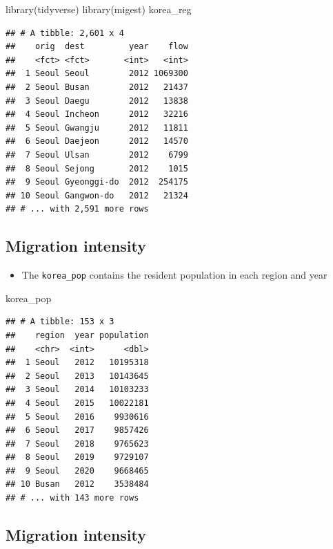 \documentclass[
]{book}
\newenvironment{Shaded}{\begin{snugshade}}{\end{snugshade}}
\newcommand{\FunctionTok}[1]{\textcolor[rgb]{0.00,0.00,0.00}{#1}}
\newcommand{\NormalTok}[1]{#1}
\providecommand{\tightlist}{%
  \setlength{\itemsep}{0pt}\setlength{\parskip}{0pt}}
\begin{document}
\begin{Shaded}
\begin{Highlighting}[]
\FunctionTok{library}\NormalTok{(tidyverse)}
\FunctionTok{library}\NormalTok{(migest)}
\NormalTok{korea\_reg}
\end{Highlighting}
\end{Shaded}

\begin{verbatim}
## # A tibble: 2,601 x 4
##    orig  dest         year    flow
##    <fct> <fct>       <int>   <int>
##  1 Seoul Seoul        2012 1069300
##  2 Seoul Busan        2012   21437
##  3 Seoul Daegu        2012   13838
##  4 Seoul Incheon      2012   32216
##  5 Seoul Gwangju      2012   11811
##  6 Seoul Daejeon      2012   14570
##  7 Seoul Ulsan        2012    6799
##  8 Seoul Sejong       2012    1015
##  9 Seoul Gyeonggi-do  2012  254175
## 10 Seoul Gangwon-do   2012   21324
## # ... with 2,591 more rows
\end{verbatim}

\hypertarget{migration-intensity-3}{%
\subsection{Migration intensity}\label{migration-intensity-3}}

\begin{itemize}
\tightlist
\item
  The \texttt{korea\_pop} contains the resident population in each region and year
\end{itemize}

\begin{Shaded}
\begin{Highlighting}[]
\NormalTok{korea\_pop}
\end{Highlighting}
\end{Shaded}

\begin{verbatim}
## # A tibble: 153 x 3
##    region  year population
##    <chr>  <int>      <dbl>
##  1 Seoul   2012   10195318
##  2 Seoul   2013   10143645
##  3 Seoul   2014   10103233
##  4 Seoul   2015   10022181
##  5 Seoul   2016    9930616
##  6 Seoul   2017    9857426
##  7 Seoul   2018    9765623
##  8 Seoul   2019    9729107
##  9 Seoul   2020    9668465
## 10 Busan   2012    3538484
## # ... with 143 more rows
\end{verbatim}

\hypertarget{migration-intensity-4}{%
\subsection{Migration intensity}\label{migration-intensity-4}}
\end{document}
